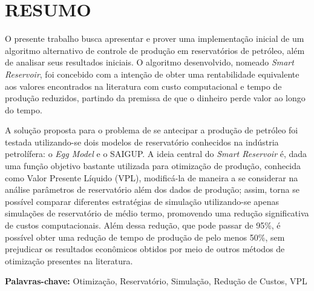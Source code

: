 
\chapter[RESUMO]{RESUMO}
{O presente trabalho busca apresentar e prover uma implementa\c{c}\~{a}o inicial de um algoritmo alternativo de controle de produ\c{c}\~{a}o em reservat\'{o}rios de petr\'{o}leo, al\'{e}m de analisar seus resultados iniciais. O algoritmo desenvolvido, nomeado \textit{Smart Reservoir}, foi concebido com a inten\c{c}\~{a}o de obter uma rentabilidade equivalente aos valores encontrados na literatura com custo computacional e tempo de produ\c{c}\~{a}o reduzidos, partindo da premissa de que o dinheiro perde valor ao longo do tempo. 

A solu\c{c}\~{a}o proposta para o problema de se antecipar a produ\c{c}\~{a}o de petr\'{o}leo foi testada utilizando-se dois modelos de reservat\'{o}rio conhecidos na ind\'{u}stria petrol\'{i}fera: o \textit{Egg Model} e o SAIGUP. A ideia central do \textit{Smart Reservoir} \'{e}, dada uma fun\c{c}\~{a}o objetivo bastante utilizada para otimiza\c{c}\~{a}o de produ\c{c}\~{a}o, conhecida como Valor Presente L\'{i}quido (VPL), modific\'{a}-la de maneira a se considerar na an\'{a}lise par\^{a}metros de reservat\'{o}rio al\'{e}m dos dados de produ\c{c}\~{a}o; assim, torna se poss\'{i}vel comparar diferentes estrat\'{e}gias de simula\c{c}\~{a}o utilizando-se apenas simula\c{c}\~{o}es de reservat\'{o}rio de m\'{e}dio termo, promovendo uma redu\c{c}\~{a}o significativa de custos computacionais. Al\'{e}m dessa redu\c{c}\~{a}o, que pode passar de 95\%,  \'{e} poss\'{i}vel obter uma redu\c{c}\~{a}o de tempo de produ\c{c}\~{a}o de pelo menos 50\%, sem prejudicar os resultados econ\^{o}micos obtidos por meio de outros m\'{e}todos de otimiza\c{c}\~{a}o presentes na literatura.

\textbf{Palavras-chave:} Otimiza\c{c}\~{a}o, Reservat\'{o}rio, Simula\c{c}\~{a}o, Redu\c{c}\~{a}o de Custos, VPL
}

\vspace*{2cm}

\newpage


